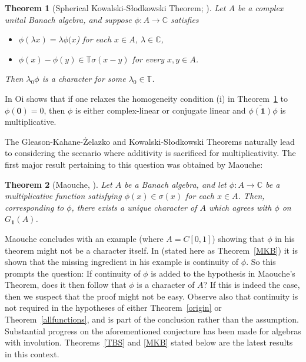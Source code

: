 \documentclass{amsart}
\newtheorem{theorem}{Theorem}[section]
\theoremstyle{definition}
\theoremstyle{remark}
\begin{document}
	

	
		\begin{theorem}[Spherical Kowalski-S\l{}odkowski Theorem; {\cite[Proposition 3.2]{Li}}]\label{sphere2}
		Let $A$ be a complex unital Banach algebra, and suppose $\phi:A\rightarrow\mathbb C$ satisfies 
		\begin{itemize}
			\item[(i)]{$\phi(\lambda x)=\lambda\phi(x$) for each $x\in A$, $\lambda\in\mathbb C$,}
			\item[(ii)]{$\phi(x)-\phi(y)\in\mathbb T\sigma(x-y)$ for every $x,y\in A$. }
		\end{itemize}
		Then $\lambda_0\phi$ is a character for some $\lambda_0\in\mathbb T$.  
	\end{theorem}
	
	In \cite{Oi} Oi shows that if one relaxes the homogeneity condition (i) in Theorem~\ref{sphere2}
	to $\phi(\mathbf 0)=0$, then $\phi$ is either complex-linear or conjugate linear and $\overline{\phi(\mathbf 1)}\phi$ is multiplicative.
	
	 The Gleason-Kahane-\.{Z}elazko and Kowalski-S\l{}odkowski Theorems naturally lead to considering the scenario where additivity is sacrificed for multiplicativity. The first major result pertaining to this question was obtained by Maouche: 
	
	\begin{theorem}[Maouche, \cite{Maouche1996}]\label{Maouche}
		Let $A$ be a Banach algebra, and let $\phi:A\rightarrow\mathbb C$ be a multiplicative function satisfying $\phi(x)\in\sigma(x)$ for each $x\in A$. Then, corresponding to $\phi$, there exists a unique character of $A$ which agrees with $\phi$ on $G_{\mathbf 1}(A)$. 
	\end{theorem}
	
	Maouche concludes with an example (where $A=C[0,1]$) showing that $\phi$ in his theorem might not be a character itself. In \cite{Mabrouk} (stated here as Theorem~\ref{MKB}) it is shown that the missing ingredient in his example is continuity of $\phi$. So this prompts the question: If continuity of $\phi$ is added to the hypothesis in Maouche's Theorem, does it then follow that $\phi$ is a character of $A$? If this is indeed the case, then we suspect that the proof might not be easy. Observe also that continuity is not required in the hypotheses of either Theorem~\ref{origin} or Theorem~\ref{allfunctions}, and is part of the conclusion rather than the assumption. Substantial progress on the aforementioned conjecture has been made for algebras with involution. Theorems~\ref{TBS} and \ref{MKB} stated below are the latest results in this context. 
	
\end{document}
